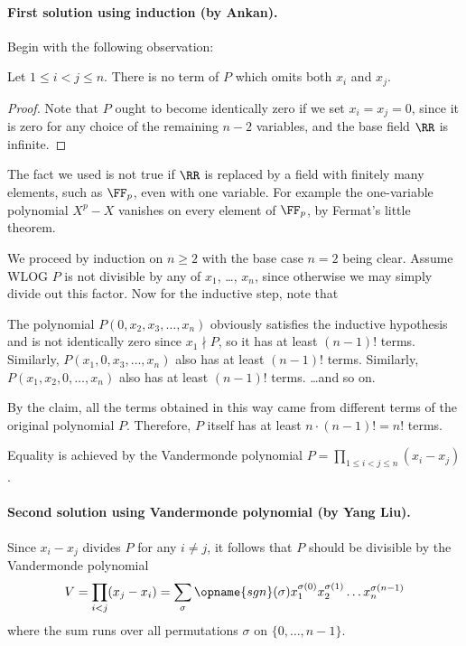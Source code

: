 \documentclass[11pt]{scrartcl}
\begin{document}
\paragraph{First solution using induction (by Ankan).}
Begin with the following observation:
\begin{claim*}
  Let $1 \le i < j \le n$.
  There is no term of $P$ which omits both $x_i$ and $x_j$.
\end{claim*}
\begin{proof}
  Note that $P$ ought to become identically zero
  if we set $x_i = x_j = 0$,
  since it is zero for any choice of the remaining $n-2$ variables,
  and the base field $\RR$ is infinite.
\end{proof}
\begin{remark*}
  The fact we used is not true if $\RR$ is replaced by a field
  with finitely many elements, such as $\FF_p$,
  even with one variable.
  For example the one-variable polynomial $X^p-X$ vanishes
  on every element of $\FF_p$,
  by Fermat's little theorem.
\end{remark*}

We proceed by induction on $n \ge 2$ with the base case $n=2$ being clear.
Assume WLOG $P$ is not divisible by any of $x_1$, \dots, $x_n$,
since otherwise we may simply divide out this factor.
Now for the inductive step, note that
\begin{itemize}
  \ii The polynomial $P(0, x_2, x_3, \dots, x_n)$
  obviously satisfies the inductive hypothesis
  and is not identically zero since $x_1 \nmid P$,
  so it has at least $(n-1)!$ terms.
  \ii Similarly, $P(x_1, 0, x_3, \dots, x_n)$
  also has at least $(n-1)!$ terms.
  \ii Similarly, $P(x_1, x_2, 0, \dots, x_n)$
  also has at least $(n-1)!$ terms.
  \ii \dots and so on.
\end{itemize}
By the claim, all the terms obtained in this way
came from different terms of the original polynomial $P$.
Therefore, $P$ itself has at least $n \cdot (n-1)! = n!$ terms.

\begin{remark*}
  Equality is achieved by the
  Vandermonde polynomial
  $P = \prod_{1 \le i < j \le n} (x_i-x_j)$.
\end{remark*}

\paragraph{Second solution using Vandermonde polynomial (by Yang Liu).}
Since $x_i - x_j$ divides $P$ for any $i \neq j$, it follows that
$P$ should be divisible by the Vandermonde polynomial
\[ V = \prod_{i<j} (x_j-x_i)
  = \sum_{\sigma} \opname{sgn}(\sigma) x_1^{\sigma(0)}
  x_2^{\sigma(1)} \dots x_n^{\sigma(n-1)} \]
where the sum runs over all permutations $\sigma$ on $\{0, \dots, n-1\}$.
\end{document}
